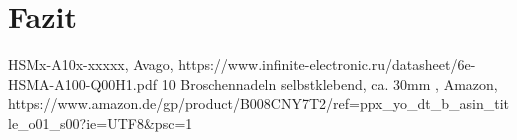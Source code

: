 \documentclass[a4paper,
DIV=13,
12pt,
BCOR=10mm,
department=FakEI,
parskip=half,
automark,
]{article}
\begin{document}
\section{Fazit}








\cleardoublepage
\begin{appendix}
\listoffigures

\cleardoublepage
\begin{thebibliography}{99}
 HSMx-A10x-xxxxx, Avago, https://www.infinite-electronic.ru/datasheet/6e-HSMA-A100-Q00H1.pdf
 10 Broschennadeln selbstklebend, ca. 30mm , Amazon, https://www.amazon.de/gp/product/B008CNY7T2/ref=ppx_yo_dt_b_asin_title_o01_s00?ie=UTF8&psc=1
\end{thebibliography}

\cleardoublepage

\end{appendix}
\end{document}

